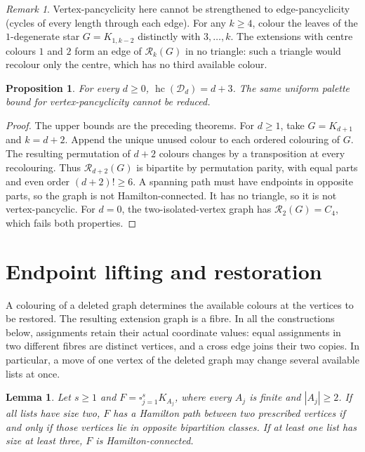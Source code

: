 \documentclass[11pt]{article}
\newtheorem{lemma}[theorem]{Lemma}
\newtheorem{proposition}[theorem]{Proposition}
\theoremstyle{remark}
\newtheorem{remark}[theorem]{Remark}
\newcommand{\R}{\mathcal R}
\newcommand{\Rk}{\mathcal R_k}
\newcommand{\hc}{\operatorname{hc}}
\numberwithin{equation}{section}
\numberwithin{table}{section}
\begin{document}
\begin{remark}\label{rem:not-edge-pancyclic}
Vertex-pancyclicity here cannot be strengthened to edge-pancyclicity
(cycles of every length through each edge). For any $k\ge4$, colour the
leaves of the $1$-degenerate star $G=K_{1,k-2}$ distinctly with
$3,\ldots,k$. The extensions with centre colours $1$ and $2$ form an
edge of $\Rk(G)$ in no triangle: such a triangle would recolour only
the centre, which has no third available colour.
\end{remark}


\begin{proposition}\label{prop:degenerate-sharp}
For every $d\ge0$, $\hc(\mathcal D_d)=d+3$. The same uniform palette
bound for vertex-pancyclicity cannot be reduced.
\end{proposition}
\begin{proof}
The upper bounds are the preceding theorems. For $d\ge1$, take
$G=K_{d+1}$ and $k=d+2$. Append the unique unused colour to each
ordered colouring of $G$. The resulting permutation of $d+2$ colours
changes by a transposition at every recolouring. Thus $\R_{d+2}(G)$
is bipartite by permutation parity, with equal parts and even order
$(d+2)!\ge6$. A spanning path must have endpoints in opposite parts,
so the graph is not Hamilton-connected. It has no triangle, so it is
not vertex-pancyclic. For $d=0$, the two-isolated-vertex graph has
$\R_2(G)=C_4$, which fails both properties.
\end{proof}

\section{Endpoint lifting and restoration}
\label{sec:restoration}

A colouring of a deleted graph determines the available colours at the
vertices to be restored.  The resulting extension graph is a fibre.  In
all the constructions below, assignments retain their actual coordinate
values: equal assignments in two different fibres are distinct vertices,
and a cross edge joins their two copies.  In particular, a move of one
vertex of the deleted graph may change several available lists at once.

\begin{lemma}
\label{lem:product}
Let $s\ge1$ and $F=\square_{j=1}^s K_{A_j}$, where every $A_j$ is
finite and $|A_j|\ge2$.  If all lists have size two, $F$ has a
Hamilton path between two prescribed vertices if and only if those
vertices lie in opposite bipartition classes.  If at least one list has
size at least three, $F$ is Hamilton-connected.
\end{lemma}
\end{document}
